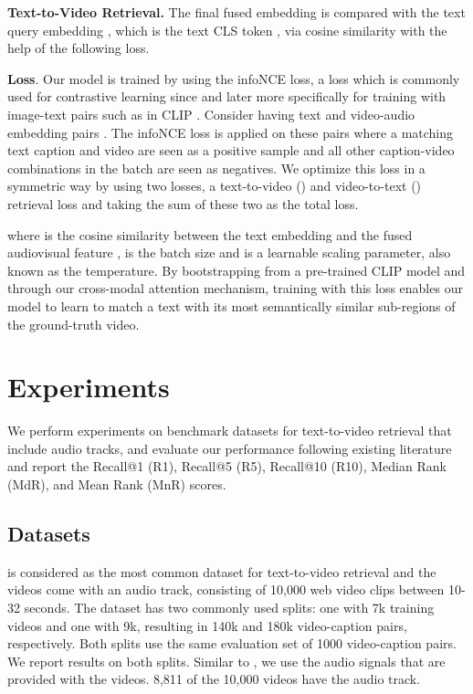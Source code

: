 \documentclass[10pt,twocolumn,letterpaper]{article}
\begin{document}
\noindent \textbf{Text-to-Video Retrieval.} The final fused embedding  is compared with the text query embedding , which is the text CLS token , via cosine similarity with the help of the following loss.

\noindent \textbf{Loss}. Our model is trained by using the infoNCE loss, a loss which is commonly used for contrastive learning since \cite{cpc} and later more specifically for training with image-text pairs such as in CLIP \cite{clip}. Consider having  text and video-audio embedding pairs . The infoNCE loss is applied on these pairs where a matching text caption and video are seen as a positive sample and all other caption-video combinations in the batch are seen as negatives. We optimize this loss in a symmetric way by using two losses, a text-to-video () and video-to-text () retrieval loss and taking the sum of these two as the total loss. 





where  is the cosine similarity between the text embedding  and the fused audiovisual feature ,  is the batch size and  is a learnable scaling parameter, also known as the temperature. By bootstrapping from a pre-trained CLIP model and through our cross-modal attention mechanism, training with this loss enables our model to learn to match a text with its most semantically similar sub-regions of the ground-truth video. 

\section{Experiments}

We perform experiments on benchmark datasets for text-to-video retrieval that include audio tracks, and evaluate our performance following existing literature \cite{gorti2022xpool} and report the Recall@1 (R1), Recall@5 (R5), Recall@10 (R10), Median Rank (MdR), and Mean Rank (MnR) scores.

\subsection{Datasets}

 \cite{msrvtt} is considered as the most common dataset for text-to-video retrieval and the videos come with an audio track, consisting of 10,000 web video clips between 10-32 seconds. The dataset has two commonly used splits: one with 7k training videos and one with 9k, resulting in 140k and 180k video-caption pairs, respectively. Both splits use the same evaluation set of 1000 video-caption pairs. We report results on both splits.
Similar to \cite{hao2018integrating, everythingatonce, ECLIPSE_ECCV22}, we use the audio signals that are provided with the videos. 8,811 of the 10,000 videos have the audio track.
\end{document}
